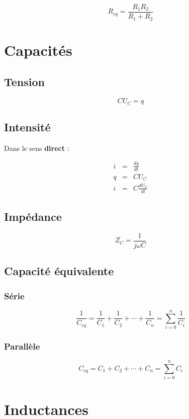 \documentclass[a4paper, 11pt]{article}
\begin{document}
        $$R_{eq} = \frac{R_1R_2}{R_1+R_2}$$

    \section{Capacités}

        \subsection{Tension}

        $$CU_C=q$$

        \subsection{Intensité}

        Dans le sens {\bf direct} :

        \begin{eqnarray*}
            i & = & \frac{dq}{dt} \\
            q & = & CU_C \\
            i & = & C\frac{dU_C}{dt}
        \end{eqnarray*}

        \subsection{Impédance}

        $$Z_C = \frac{1}{j\omega C}$$

        \subsection{Capacité équivalente}
        
        \subsubsection{Série}

        $$\frac{1}{C_{eq}} = \frac{1}{C_1} + \frac{1}{C_2} + \cdots + \frac{1}{C_n} = \sum_{i=0}^n \frac{1}{C_i}$$

        \subsubsection{Parallèle}

        $$C_{eq} = C_1 + C_2 + \cdots + C_n = \sum_{i=0}^n C_i$$

    \section{Inductances}
    
\end{document}
